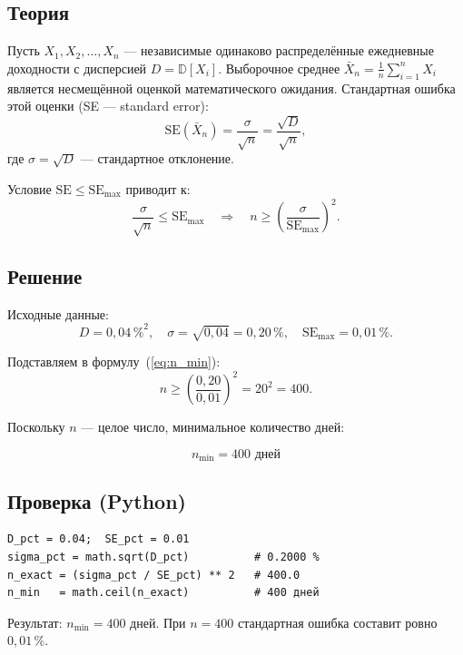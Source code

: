 \documentclass[a4paper,14pt]{article}
\begin{document}
\subsection*{Теория}

Пусть $X_1, X_2, \ldots, X_n$ — независимые одинаково распределённые ежедневные доходности с дисперсией $D = \mathbb{D}[X_i]$.
Выборочное среднее $\bar{X}_n = \frac{1}{n}\sum_{i=1}^n X_i$ является несмещённой оценкой математического ожидания.
Стандартная ошибка этой оценки (SE — standard error):
\begin{equation}
    \mathrm{SE}(\bar{X}_n) = \frac{\sigma}{\sqrt{n}} = \frac{\sqrt{D}}{\sqrt{n}},
    \label{eq:se}
\end{equation}
где $\sigma = \sqrt{D}$ — стандартное отклонение.

Условие $\mathrm{SE} \leq \mathrm{SE}_{\max}$ приводит к:
\begin{equation}
    \frac{\sigma}{\sqrt{n}} \leq \mathrm{SE}_{\max}
    \quad\Longrightarrow\quad
    n \geq \left(\frac{\sigma}{\mathrm{SE}_{\max}}\right)^2.
    \label{eq:n_min}
\end{equation}

\subsection*{Решение}

Исходные данные:
\[
    D = 0{,}04\,\%^2, \quad \sigma = \sqrt{0{,}04} = 0{,}20\,\%, \quad \mathrm{SE}_{\max} = 0{,}01\,\%.
\]

Подставляем в формулу~(\ref{eq:n_min}):
\[
    n \geq \left(\frac{0{,}20}{0{,}01}\right)^2 = 20^2 = 400.
\]

Поскольку $n$ — целое число, минимальное количество дней:

\[
    \boxed{n_{\min} = 400 \text{ дней}}
\]

\subsection*{Проверка (Python)}

\begin{verbatim}
D_pct = 0.04;  SE_pct = 0.01
sigma_pct = math.sqrt(D_pct)          # 0.2000 %
n_exact = (sigma_pct / SE_pct) ** 2   # 400.0
n_min   = math.ceil(n_exact)          # 400 дней
\end{verbatim}

Результат: $n_{\min} = 400$ дней. При $n = 400$ стандартная ошибка составит ровно $0{,}01\,\%$.
\end{document}

